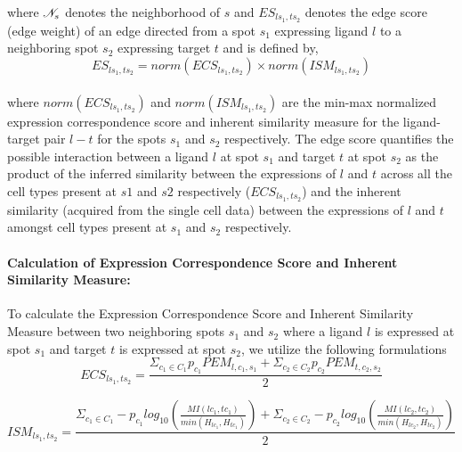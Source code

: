 where $\mathcal{N}_s$ denotes the neighborhood of $s$ and $ES_{ls_1,ts_2}$ denotes the edge score (edge weight) of an edge directed from a spot $s_1$ expressing ligand $l$ to a neighboring spot $s_2$ expressing target $t$ and is defined by,
\\
$$ES_{ls_1,ts_2} = norm(ECS_{ls_1,ts_2}) \times norm(ISM_{ls_1,ts_2})$$
\\
where $norm(ECS_{ls_1,ts_2})$ and $norm(ISM_{ls_1,ts_2})$ are the min-max normalized expression correspondence score and inherent similarity measure for the ligand-target pair $l-t$ for the spots $s_1$ and $s_2$ respectively. The edge score quantifies the possible interaction between a ligand $l$ at spot $s_1$ and target $t$ at spot $s_2$ as the product of the inferred similarity between the expressions of $l$ and $t$ across all the cell types present at $s1$ and $s2$ respectively ($ECS_{ls_1,ts_2}$) and the inherent similarity (acquired from the single cell data) between the expressions of $l$ and $t$ amongst cell types present at $s_1$ and $s_2$ respectively.

\paragraph{Calculation of Expression Correspondence Score and Inherent Similarity Measure:} To calculate the Expression Correspondence Score and Inherent Similarity Measure between two neighboring spots $s_1$ and $s_2$ where a ligand $l$ is expressed at spot $s_1$ and target $t$ is expressed at spot $s_2$, we utilize the following formulations
\begin{equation}
    ECS_{ls_1,ts_2} = \frac{\Sigma_{c_1 \in C_1} p_{c_1}PEM_{l,c_1,s_1} + \Sigma_{c_2 \in C_2} p_{c_2}PEM_{t,c_2,s_2}}{2}
\end{equation}

\begin{equation}\label{e4}
    ISM_{ls_1,ts_2} = \frac{\Sigma_{c_1 \in C_1} -p_{c_1}log_{10}(\frac{MI(lc_1,tc_1)}{min(H_{lc_1},H_{tc_1})}) + \Sigma_{c_2 \in C_2} -p_{c_2}log_{10}(\frac{MI(lc_2,tc_2)}{min(H_{lc_2},H_{tc_2})})}{2}
\end{equation}


